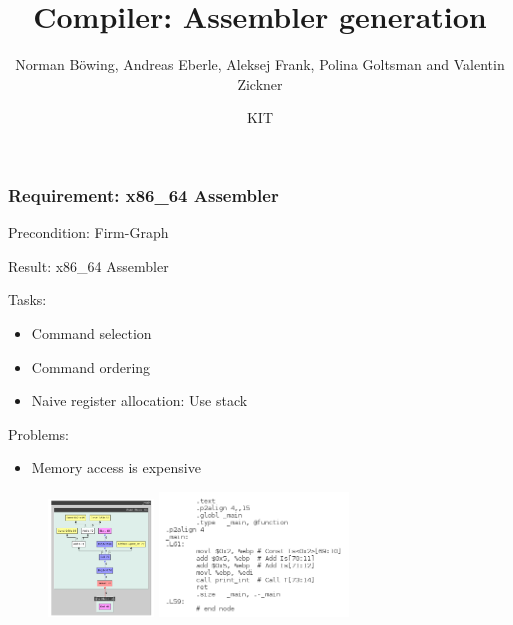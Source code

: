 \documentclass[t]{beamer}
\title[]{Compiler: Assembler generation}
\subtitle{Norman B\"owing, Andreas Eberle, Aleksej Frank, Polina Goltsman and Valentin Zickner}
\author[Team replimoc: Norman B\"owing, Andreas Eberle, Aleksej Frank, Polina Goltsman and Valentin Zickner]{KIT}
\institute[Institute for Program Structures and Data Organization (IPD)]{KARLSRUHE INSTITUTE OF TECHNOLOGY (KIT)}
\begin{document}
\begin{frame}
  \maketitle
\end{frame}

\begin{frame}
  \frametitle{Requirement: x86\_64 Assembler}
\begin{itemize}
  \item Precondition: Firm-Graph
 {
  \item Result: x86\_64 Assembler
}
 {
  \item Tasks:
  \begin{itemize}
    \item Command selection
    \item Command ordering
    \item Naive register allocation: Use stack
  \end{itemize}
}
 {
  \item Problems:
  \begin{itemize}
    \item Memory access is expensive
  \end{itemize}
}
\end{itemize}

\begin{figure}
\includegraphics[width=0.25\textwidth]{images/firmgraph.png}
 {
\includegraphics[width=0.45\textwidth]{images/assembler.png}
}
\end{figure}

\end{frame}
\end{document}
